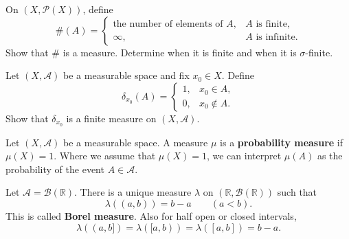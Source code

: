\documentclass[12pt,a4paper]{article}
\begin{document}
\clearpage

\begin{problem}
    On $(X,\mathcal{P}(X))$, define
    \[
        \#(A)=
        \begin{cases}
            \text{the number of elements of $A$},&A\text{ is finite},\\
            \infty,&A\text{ is infinite}.
        \end{cases}
    \]
    Show that $\#$ is a measure. Determine when it is finite and when it is $\sigma$-finite.
\end{problem}

\clearpage

\begin{problem}
    Let $(X,\mathcal{A})$ be a measurable space and fix $x_0\in X$. Define
    \[
        \delta_{x_0}(A)=
        \begin{cases}
            1,&x_0\in A,\\
            0,&x_0\notin A.
        \end{cases}
    \]
    Show that $\delta_{x_0}$ is a finite measure on $(X,\mathcal{A})$.
\end{problem}

\clearpage

\begin{problem}
    Let $(X,\mathcal{A})$ be a measurable space. A measure $\mu$ is a \textbf{probability measure} if $\mu(X)=1$. Where we assume that $\mu(X)=1$, we can interpret $\mu(A)$ as the probability of the event $A\in\mathcal{A}$.
\end{problem}

\clearpage

\begin{problem}
    Let $\mathcal{A}=\mathcal{B}(\mathbb{R})$. There is a unique measure $\lambda$ on $(\mathbb{R},\mathcal{B}(\mathbb{R}))$ such that
    \[
        \lambda((a,b))=b-a\qquad(a<b).
    \]
    This is called \textbf{Borel measure}. Also for half open or closed intervals,
    \[\lambda((a,b])=\lambda([a,b))=\lambda([a,b])=b-a.\]
\end{problem}

\clearpage
\end{document}
